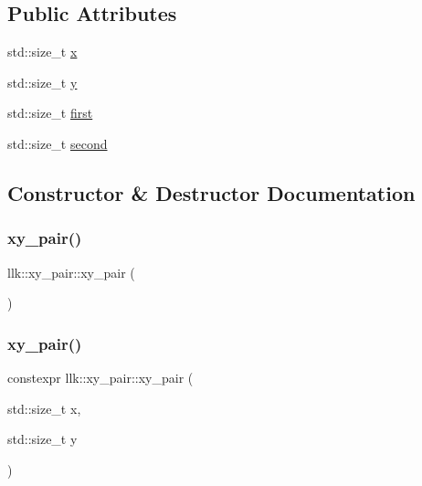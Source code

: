 \subsection*{Public Attributes}
\begin{DoxyCompactItemize}
\item 
std\+::size\+\_\+t \hyperlink{structllk_1_1xy__pair_a0529eda73df053ddcc7662187ca57e23}{x}
\item 
std\+::size\+\_\+t \hyperlink{structllk_1_1xy__pair_a95998ff2c605752606fea129d2adb409}{y}
\item 
std\+::size\+\_\+t \hyperlink{structllk_1_1xy__pair_acec3f70be79e2e1ccbf2e40853a85101}{first}
\item 
std\+::size\+\_\+t \hyperlink{structllk_1_1xy__pair_ab150c1eaffd7963239c139d330851e67}{second}
\end{DoxyCompactItemize}


\subsection{Constructor \& Destructor Documentation}
\mbox{\label{structllk_1_1xy__pair_ae83534da806de13692d9a1f513a61968}} 
\subsubsection{\texorpdfstring{xy\+\_\+pair()}{xy\_pair()}\hspace{0.1cm}{\footnotesize\ttfamily [1/4]}}
{\footnotesize\ttfamily llk\+::xy\+\_\+pair\+::xy\+\_\+pair (\begin{DoxyParamCaption}{ }\end{DoxyParamCaption})\hspace{0.3cm}{\ttfamily [inline]}}

\mbox{\label{structllk_1_1xy__pair_aa8dc8fdc3fd5663ef038996ef30aa5b8}} 
\subsubsection{\texorpdfstring{xy\+\_\+pair()}{xy\_pair()}\hspace{0.1cm}{\footnotesize\ttfamily [2/4]}}
{\footnotesize\ttfamily constexpr llk\+::xy\+\_\+pair\+::xy\+\_\+pair (\begin{DoxyParamCaption}\item[{std\+::size\+\_\+t}]{x,  }\item[{std\+::size\+\_\+t}]{y }\end{DoxyParamCaption})\hspace{0.3cm}{\ttfamily [inline]}}

